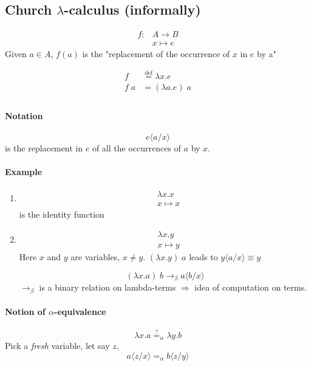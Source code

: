 \documentclass{article}
\newcommand\subst[2]{\langle #1\big/#2\rangle}
\begin{document}
\subsection{Church $\lambda$-calculus (informally)}
\begin{align*}
f: &A \to B\\
& x \mapsto e
\end{align*}
Given $a\in A$, $f(a)$ is the "replacement of the occurrence of $x$ in $e$ by a"

\begin{align*}
f & \overset{\text{def}}{=} \lambda x.e \tag{$\lambda$-abstraction}\\
f\;a & = (\lambda a.e) \;a \tag{Application}\\
\end{align*}

\paragraph{Notation}
\[e\subst{a}{x}\] is the replacement in $e$ of all the occurrences of $a$ by $x$.

\paragraph{Example}
\begin{enumerate}
\item \begin{align*}
&\lambda x. x\\
&x\mapsto x
\end{align*}
is the identity function
\item \begin{align*}
&\lambda x.y\\
&x\mapsto y
\end{align*}
Here $x$ and $y$ are variables, $x\neq y$. $(\lambda x.y)\; a$ leads to $y\subst{a}{x}\equiv y$

\[ (\lambda x.a) \; b \to_\beta a\subst{b}{x}\]
$\to_\beta$ is a binary relation on lambda-terms $\Rightarrow$ idea of computation on terms.

\end{enumerate}

\paragraph{Notion of $\alpha$-equivalence}
\[\lambda x.a \overset{?}{=}_\alpha \lambda y.b\]
Pick a \emph{fresh} variable, let say $z$,
\[a\subst{z}{x} =_\alpha b\subst{z}{y}\]
\end{document}
